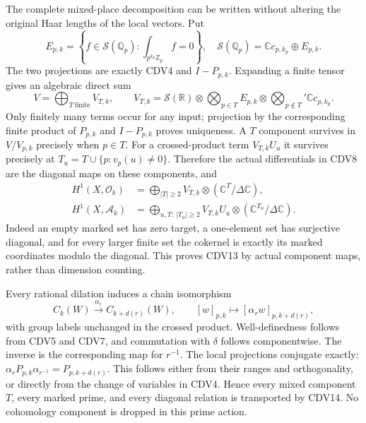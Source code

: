 \documentclass[11pt,a4paper]{article}
\theoremstyle{definition}\newtheorem{definition}[theorem]{Definition}
\begin{document}
The complete mixed-place decomposition can be written without altering
the original Haar lengths of the local vectors. Put
\begin{equation}\tag{CDV11}
 E_{p,k}=\left\{f\in\mathcal S(\mathbb Q_p):
                  \int_{p^{k_p}\mathbb Z_p}f=0\right\},\quad
 \mathcal S(\mathbb Q_p)=\mathbb Cc_{p,k_p}\oplus E_{p,k}.
\end{equation}
The two projections are exactly CDV4 and $I-P_{p,k}$. Expanding a
finite tensor gives an algebraic direct sum
\begin{equation}\tag{CDV12}
 V=\bigoplus_{T\ \mathrm{finite}}V_{T,k},\qquad
 V_{T,k}=\mathcal S(\mathbb R)\otimes
       \bigotimes_{p\in T}E_{p,k}\otimes
       \bigotimes_{p\notin T}'\mathbb Cc_{p,k_p}.
\end{equation}
Only finitely many terms occur for any input; projection by the
corresponding finite product of $P_{p,k}$ and $I-P_{p,k}$ proves
uniqueness. A $T$ component survives in $V/V_{p,k}$ precisely when
$p\in T$. For a crossed-product term $V_{T,k}U_u$ it survives
precisely at
$T_u=T\cup\{p:v_p(u)\ne0\}$. Therefore the actual differentials
in CDV8 are the diagonal maps on these components, and
\begin{equation}\tag{CDV13}
\begin{split}
 H^1(X,\mathcal O_k)
  &=\bigoplus_{|T|\ge2}
          V_{T,k}\otimes(\mathbb C^T/\Delta\mathbb C),\\
 H^1(X,\mathcal A_k)
  &=\bigoplus_{u,T:\ |T_u|\ge2}
          V_{T,k}U_u\otimes(\mathbb C^{T_u}/\Delta\mathbb C).
\end{split}
\end{equation}
Indeed an empty marked set has zero target, a one-element set has
surjective diagonal, and for every larger finite set the cokernel is
exactly its marked coordinates modulo the diagonal. This proves
CDV13 by actual component maps, rather than dimension counting.

Every rational dilation induces a chain isomorphism
\begin{equation}\tag{CDV14}
 C_k(W)\xrightarrow{\alpha_r}C_{k+d(r)}(W),\qquad
 [w]_{p,k}\longmapsto[\alpha_rw]_{p,k+d(r)},
\end{equation}
with group labels unchanged in the crossed product. Well-definedness
follows from CDV5 and CDV7, and commutation with $\delta$ follows
componentwise. The inverse is the corresponding map for $r^{-1}$.
The local projections conjugate exactly:
$\alpha_rP_{p,k}\alpha_{r^{-1}}=P_{p,k+d(r)}$.
This follows either from their ranges and orthogonality, or directly
from the change of variables in CDV4. Hence every mixed component
$T$, every marked prime, and every diagonal relation is transported
by CDV14. No cohomology component is dropped in this prime action.
\end{document}
